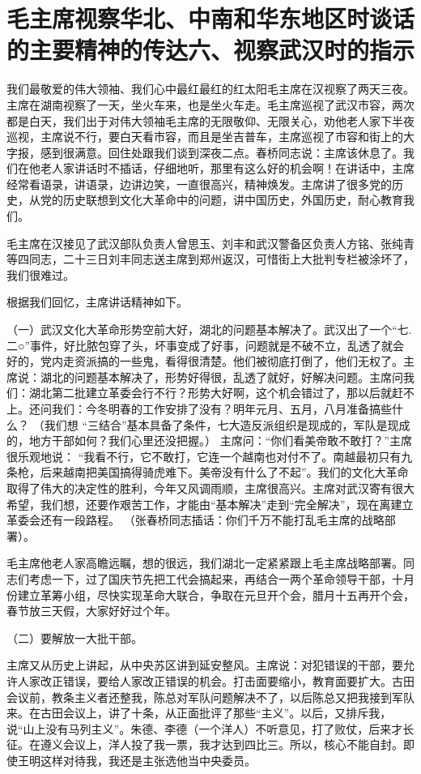 \section[毛主席视察华北、中南和华东地区时谈话的主要精神的传达六、视察武汉时的指示]{毛主席视察华北、中南和华东地区时谈话的主要精神的传达六、视察武汉时的指示}


我们最敬爱的伟大领袖、我们心中最红最红的红太阳毛主席在汉视察了两天三夜。主席在湖南视察了一天，坐火车来，也是坐火车走。毛主席巡视了武汉市容，两次都是白天，我们出于对伟大领袖毛主席的无限敬仰、无限关心，劝他老人家下半夜巡视，主席说不行，要白天看市容，而且是坐吉普车，主席巡视了市容和街上的大字报，感到很满意。回住处跟我们谈到深夜二点。春桥同志说：主席该休息了。我们在他老人家讲话时不插话，仔细地听，那里有这么好的机会啊！在讲话中，主席经常看语录，讲语录，边讲边笑，一直很高兴，精神焕发。主席讲了很多党的历史，从党的历史联想到文化大革命中的问题，讲中国历史，外国历史，耐心教育我们。

  毛主席在汉接见了武汉部队负责人曾思玉、刘丰和武汉警备区负责人方铭、张纯青等四同志，二十三日刘丰同志送主席到郑州返汉，可惜街上大批判专栏被涂坏了，我们很难过。

根据我们回忆，主席讲话精神如下。

（一）武汉文化大革命形势空前大好，湖北的问题基本解决了。武汉出了一个“七.二○”事件，好比脓包穿了头，坏事变成了好事，问题就是不破不立，乱透了就会好的，党内走资派搞的一些鬼，看得很清楚。他们被彻底打倒了，他们无权了。主席说：湖北的问题基本解决了，形势好得很，乱透了就好，好解决问题。主席问我们：湖北第二批建立革委会行不行？形势大好啊，这个机会错过了，那以后就赶不上。还问我们：今冬明春的工作安排了没有？明年元月、五月，八月准备搞些什么？  （我们想 “三结合”基本具备了条件，七大造反派组织是现成的，军队是现成的，地方干部如何？我们心里还没把握。） 主席问：“你们看美帝敢不敢打？”主席很乐观地说： “我看不行，它不敢打，它连一个越南也对付不了。南越最初只有九条枪，后来越南把美国搞得骑虎难下。美帝没有什么了不起”。我们的文化大革命取得了伟大的决定性的胜利，今年又风调雨顺，主席很高兴。主席对武汉寄有很大希望，我们想，还要作艰苦工作，才能由“基本解决”走到“完全解决”，现在离建立革委会还有一段路程。  （张春桥同志插话：你们千万不能打乱毛主席的战略部署）。

毛主席他老人家高瞻远瞩，想的很远，我们湖北一定紧紧跟上毛主席战略部署。同志们考虑一下，过了国庆节先把工代会搞起来，再结合一两个革命领导干部，十月份建立革筹小组，尽快实现革命大联合，争取在元旦开个会，腊月十五再开个会，春节放三天假，大家好好过个年。

（二）要解放一大批干部。

主席又从历史上讲起，从中央苏区讲到延安整风。主席说：对犯错误的干部，要允许人家改正错误，要给人家改正错误的机会。打击面要缩小，教育面要扩大。古田会议前，教条主义者还整我，陈总对军队问题解决不了，以后陈总又把我接到军队来。在古田会议上，讲了十条，从正面批评了那些“主义”。以后，又排斥我，说“山上没有马列主义”。朱德、李德（一个洋人）不听意见，打了败仗，后来才长征。在遵义会议上，洋人投了我一票，我才达到四比三。所以，核心不能自封。即使王明这样对待我，我还是主张选他当中央委员。

